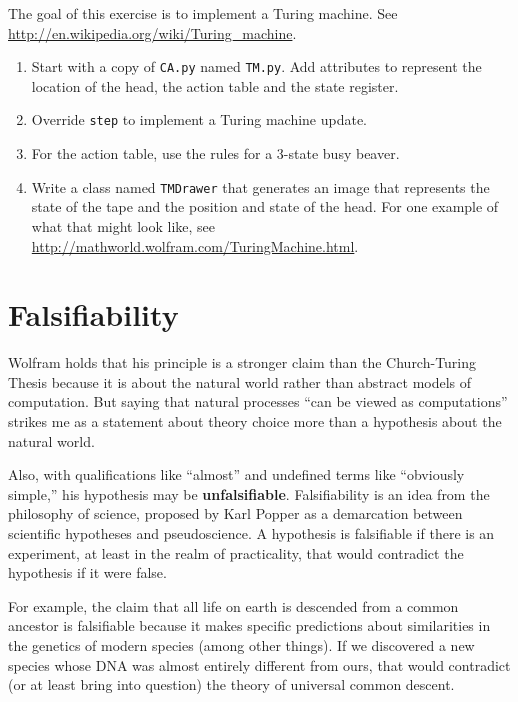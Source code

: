 \documentclass[10pt]{book}
\begin{document}
\begin{exercise}

The goal of this exercise is to implement a Turing machine.
See \url{http://en.wikipedia.org/wiki/Turing_machine}.

\begin{enumerate}

\item Start with a copy of {\tt CA.py} named {\tt TM.py}.
Add attributes to represent the location of the head, the action
table and the state register.

\item Override {\tt step} to implement a Turing machine update.

\item For the action table, use the rules for a 3-state busy beaver.

\item Write a class named {\tt TMDrawer} that generates an
image that represents the state of the tape and the position and
state of the head.  For one example of what that might look like,
see \url{http://mathworld.wolfram.com/TuringMachine.html}.

\end{enumerate}

\end{exercise}


\section{Falsifiability}

Wolfram holds that his principle is a stronger claim than the
Church-Turing Thesis because it is about the natural world rather
than abstract models of computation.  But saying that natural processes
``can be viewed as computations'' strikes me as a statement about
theory choice more than a hypothesis about the natural world.

Also, with qualifications like
``almost'' and undefined terms like ``obviously simple,'' his
hypothesis may be {\bf unfalsifiable}.  Falsifiability is
an idea from the philosophy of science, proposed by Karl Popper
as a demarcation between scientific hypotheses and pseudoscience.
A hypothesis is falsifiable if there is an experiment, at least
in the realm of practicality, that would contradict the hypothesis
if it were false.

For example, the claim that all life on earth is descended
from a common ancestor is falsifiable because it makes specific
predictions about similarities in the genetics of modern species
(among other things).  If we discovered a new species whose
DNA was almost entirely different from ours, that would
contradict (or at least bring into question) the theory of
universal common descent.
\end{document}
